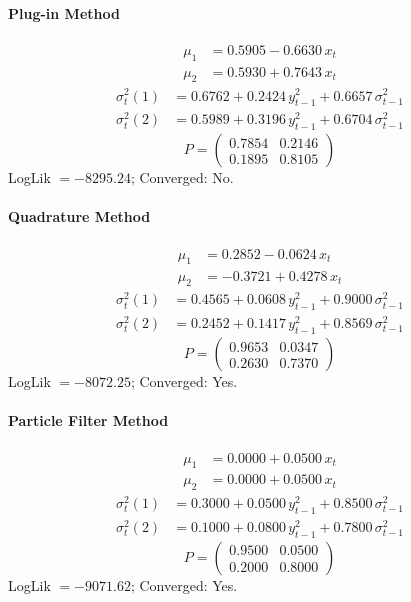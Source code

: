 \documentclass[11pt, a4paper]{article}
\begin{document}
\paragraph{Plug-in Method}
\begin{align}
\mu_{1} &= 0.5905 -0.6630\, x_t \\
\mu_{2} &= 0.5930 + 0.7643\, x_t
\end{align}
\begin{align}
\sigma^2_{t}(1) &= 0.6762 + 0.2424\, y_{t-1}^2 + 0.6657\, \sigma^2_{t-1} \\
\sigma^2_{t}(2) &= 0.5989 + 0.3196\, y_{t-1}^2 + 0.6704\, \sigma^2_{t-1}
\end{align}
\begin{equation}
P = \begin{pmatrix} 0.7854 & 0.2146 \\ 0.1895 & 0.8105 \end{pmatrix}
\end{equation}
LogLik $= -8295.24$; Converged: No.

\paragraph{Quadrature Method}
\begin{align}
\mu_{1} &= 0.2852 -0.0624\, x_t \\
\mu_{2} &= -0.3721 + 0.4278\, x_t
\end{align}
\begin{align}
\sigma^2_{t}(1) &= 0.4565 + 0.0608\, y_{t-1}^2 + 0.9000\, \sigma^2_{t-1} \\
\sigma^2_{t}(2) &= 0.2452 + 0.1417\, y_{t-1}^2 + 0.8569\, \sigma^2_{t-1}
\end{align}
\begin{equation}
P = \begin{pmatrix} 0.9653 & 0.0347 \\ 0.2630 & 0.7370 \end{pmatrix}
\end{equation}
LogLik $= -8072.25$; Converged: Yes.

\paragraph{Particle Filter Method}
\begin{align}
\mu_{1} &= 0.0000 + 0.0500\, x_t \\
\mu_{2} &= 0.0000 + 0.0500\, x_t
\end{align}
\begin{align}
\sigma^2_{t}(1) &= 0.3000 + 0.0500\, y_{t-1}^2 + 0.8500\, \sigma^2_{t-1} \\
\sigma^2_{t}(2) &= 0.1000 + 0.0800\, y_{t-1}^2 + 0.7800\, \sigma^2_{t-1}
\end{align}
\begin{equation}
P = \begin{pmatrix} 0.9500 & 0.0500 \\ 0.2000 & 0.8000 \end{pmatrix}
\end{equation}
LogLik $= -9071.62$; Converged: Yes.
\end{document}
